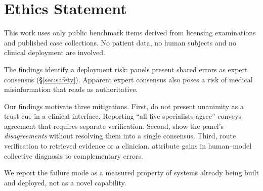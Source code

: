 \section*{Ethics Statement}

This work uses only public benchmark items derived from licensing examinations and published case
collections. No patient data, no human subjects and no clinical deployment are involved.

The findings identify a deployment risk: panels present shared errors as expert consensus
(\S\ref{sec:safety}). Apparent expert consensus also poses a risk of medical misinformation
that reads as authoritative.

Our findings motivate three mitigations. First, do not present unanimity as a trust cue in a
clinical interface. Reporting ``all five specialists agree'' conveys agreement that requires
separate verification. Second, show the panel's \emph{disagreements} without resolving them into
a single consensus. Third, route verification to retrieved evidence or a clinician.
\citet{zoller2025hybrid} attribute gains in human--model collective diagnosis to complementary
errors.

We report the failure mode as a measured property of systems already being built and deployed,
not as a novel capability.
